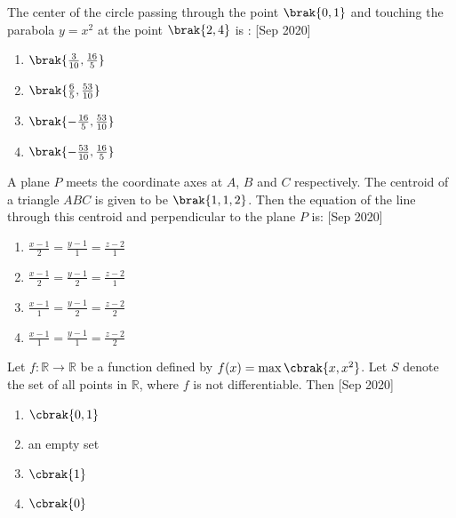     \item{
	
			The center of the circle passing through the point $\brak{0,1}$ and touching the parabola $y=x^2$ at the point $\brak{2,4}$ is :
			\text{   }\hfill
			{[Sep 2020]}
			\begin{multicols}{4}
				\begin{enumerate}
					\item $\brak{\frac{3}{10}, \frac{16}{5}}$
					\item $\brak{\frac{6}{5}, \frac{53}{10}}$
					\item $\brak{-\frac{16}{5}, \frac{53}{10}}$
					\item $\brak{-\frac{53}{10}, \frac{16}{5}}$
				\end{enumerate}
			\end{multicols}
			
		}
    \item{
	
			A plane $P$ meets the coordinate axes at $A$, $B$ and $C$ respectively. The centroid of a triangle $ABC$ is given to be $\brak{1,1,2}$. Then the equation of the line through this centroid and perpendicular to the plane $P$ is:
			\text{   }\hfill
			{[Sep 2020]}
			\begin{multicols}{2}
				\begin{enumerate}
					\item $\frac{x-1}{2} = \frac{y-1}{1} = \frac{z-2}{1}$
					
					\item $\frac{x-1}{2} = \frac{y-1}{2} = \frac{z-2}{1}$
					
					\item $\frac{x-1}{1} = \frac{y-1}{2} = \frac{z-2}{2}$
					
					\item $\frac{x-1}{1} = \frac{y-1}{1} = \frac{z-2}{2}$
				\end{enumerate}
			\end{multicols}
			
		}
    \item{
        
            Let $f : \mathbb{R}\rightarrow \mathbb{R}$ be a function defined by $f(x) = \max \cbrak{x,x^2}$. Let $S$ denote the set of all points in $\mathbb{R}$, where $f$ is not differentiable. Then
             \hfill
              {[Sep 2020]}
              \begin{multicols}{2}
              	\begin{enumerate}
              		\item $\cbrak{0,1}$
              		\item an empty set
              		\item $\cbrak{1}$
              		\item $\cbrak{0}$
              	\end{enumerate}
              \end{multicols}
        
        }


